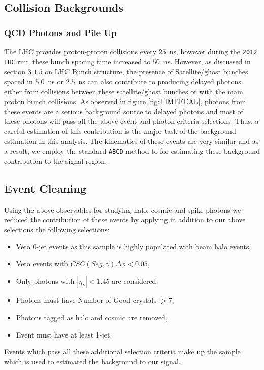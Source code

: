\subsection{Collision Backgrounds}

\subsubsection{QCD Photons and Pile Up}
The LHC provides proton-proton collisions every $25$~ns, however during the \texttt{2012 LHC} run, these bunch spacing time increased to $50$~ns. However, as discussed in section $3.1.5$ on LHC Bunch structure, the presence of 
Satellite/ghost bunches spaced in $5.0$~ns or $2.5$~ns  can also contribute to producing delayed photons either from collisions between these satellite/ghost bunches or with the main proton bunch collisions.
As observed in figure \ref{fig:TIMEECAL}, photons from these events are a serious background source to delayed photons and most of these photons will pass all the above event and photon criteria selections. Thus, a careful 
estimation of this contribution is the major task of the background estimation in this analysis.
The kinematics of these events are very similar and as a result, we employ the standard \texttt{ABCD} method to for estimating these background contribution  to the signal region.



\subsection{Event Cleaning}
Using the above observables for studying halo, cosmic and spike photons we reduced the contribution of these events by applying in addition to our above selections the following selections:
\begin{itemize}
\item Veto 0-jet events as this sample is highly populated with beam halo events, 
\item Veto events with $CSC(Seg,\gamma)\Delta\phi < 0.05$,
\item Only photons with $|\eta_{\gamma}| < 1.45$ are considered,
\item Photons must have Number of Good crystals $ > 7$,
\item Photons tagged as halo and cosmic are removed,
\item Event must have at least 1-jet.
\end{itemize}
Events which pass all these additional selection criteria make up the sample which is used to estimated the background to our signal.

